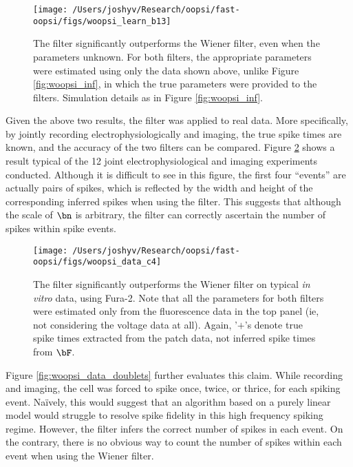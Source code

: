 \begin{figure}[h!]
\centering \texttt{[image: /Users/joshyv/Research/oopsi/fast-oopsi/figs/woopsi\_learn\_b13]}
\caption[parameters may be estimated using the \foopsi filter]{The \foopsi filter significantly outperforms the Wiener filter, even when the parameters unknown.  For both filters, the appropriate parameters were estimated using only the data shown above, unlike Figure \ref{fig:woopsi_inf}, in which the true parameters were provided to the filters. Simulation details as in Figure \ref{fig:woopsi_inf}.} \label{fig:woopsi_learn}
\end{figure}

Given the above two results, the \foopsi filter was applied to real data.  More specifically, by jointly recording electrophysiologically and imaging, the true spike times are known, and the accuracy of the two filters can be compared.  Figure \ref{fig:woopsi_data} shows a result typical of the 12 joint electrophysiological and imaging experiments conducted. Although it is difficult to see in this figure, the first four ``events'' are actually pairs of spikes, which is reflected by the width and height of the corresponding inferred spikes when using the \foopsi filter. %
This suggests that although the scale of $\bn$ is arbitrary, the \foopsi filter can correctly ascertain the number of spikes within spike events.  

\begin{figure}[h!]
\centering \texttt{[image: /Users/joshyv/Research/oopsi/fast-oopsi/figs/woopsi\_data\_c4]}
\caption[\foopsi filter outperforms Wiener filter on biological data]{The \foopsi filter significantly outperforms the Wiener filter on typical \emph{in vitro} data, using Fura-2. Note that all the parameters for both filters were estimated only from the fluorescence data in the top panel (ie, not considering the voltage data at all).  Again, '$+$'s denote true spike times extracted from the patch data, not inferred spike times from $\bF$.} \label{fig:woopsi_data}
\end{figure}

Figure \ref{fig:woopsi_data_doublets} further evaluates this claim.  While recording and imaging, the cell was forced to spike once, twice, or thrice, for each spiking event.  Na\"{i}vely, this would suggest that an algorithm based on a purely linear model would struggle to resolve spike fidelity in this high frequency spiking regime.  However, the \foopsi filter infers the correct number of spikes in each event.  On the contrary, there is no obvious way to count the number of spikes within each event when using the Wiener filter.

